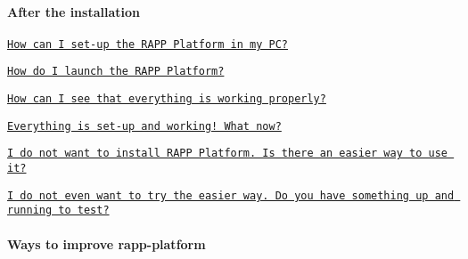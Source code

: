 \paragraph*{After the installation}


\begin{DoxyItemize}
\item \href{https://github.com/rapp-project/rapp-platform/wiki/How-can-I-set-up-the-RAPP-Platform-in-my-PC%3F}{\tt How can I set-\/up the R\-A\-P\-P Platform in my P\-C?}
\item \href{https://github.com/rapp-project/rapp-platform/wiki/How-do-I-launch-the-RAPP-Platform%3F}{\tt How do I launch the R\-A\-P\-P Platform?}
\item \href{https://github.com/rapp-project/rapp-platform/wiki/How-can-I-see-that-everything-is-working-properly%3F}{\tt How can I see that everything is working properly?}
\item \href{https://github.com/rapp-project/rapp-platform/wiki/Everything-is-set-up-and-working!-What-now%3F}{\tt Everything is set-\/up and working! What now?}
\item \href{https://github.com/rapp-project/rapp-platform/wiki/I-do-not-want-to-install-RAPP-Platform.-Is-there-an-easier-way-to-use-it%3F}{\tt I do not want to install R\-A\-P\-P Platform. Is there an easier way to use it?}
\item \href{https://github.com/rapp-project/rapp-platform/wiki/I-do-not-even-want-to-try-the-easier-way.-Do-you-have-something-up-and-running-to-test%3F}{\tt I do not even want to try the easier way. Do you have something up and running to test?}
\end{DoxyItemize}

\paragraph*{Ways to improve rapp-\/platform}


